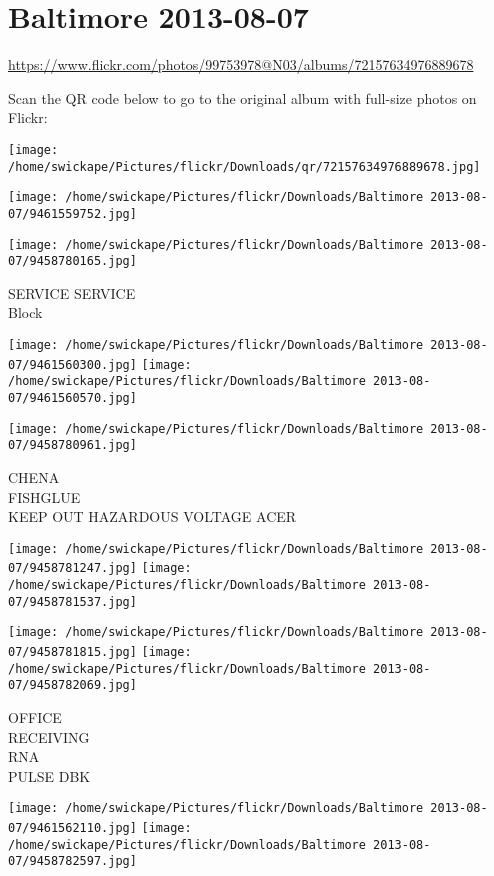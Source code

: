 \documentclass[10pt,letterpaper]{article}
\title{}
\author{}
\date{}
\begin{document}
\section*{Baltimore 2013-08-07}

\url{https://www.flickr.com/photos/99753978@N03/albums/72157634976889678}

Scan the QR code below to go to the original album with full-size photos on Flickr:

\texttt{[image: /home/swickape/Pictures/flickr/Downloads/qr/72157634976889678.jpg]}
\pagebreak

\texttt{[image: /home/swickape/Pictures/flickr/Downloads/Baltimore 2013-08-07/9461559752.jpg]}

\vspace{0.25in}
\texttt{[image: /home/swickape/Pictures/flickr/Downloads/Baltimore 2013-08-07/9458780165.jpg]}

SERVICE SERVICE\\
Block
\pagebreak

\texttt{[image: /home/swickape/Pictures/flickr/Downloads/Baltimore 2013-08-07/9461560300.jpg]}
\texttt{[image: /home/swickape/Pictures/flickr/Downloads/Baltimore 2013-08-07/9461560570.jpg]}

\vspace{0.25in}
\texttt{[image: /home/swickape/Pictures/flickr/Downloads/Baltimore 2013-08-07/9458780961.jpg]}

CHENA\\
FISHGLUE\\
KEEP OUT HAZARDOUS VOLTAGE ACER
\pagebreak

\texttt{[image: /home/swickape/Pictures/flickr/Downloads/Baltimore 2013-08-07/9458781247.jpg]}
\texttt{[image: /home/swickape/Pictures/flickr/Downloads/Baltimore 2013-08-07/9458781537.jpg]}

\texttt{[image: /home/swickape/Pictures/flickr/Downloads/Baltimore 2013-08-07/9458781815.jpg]}
\texttt{[image: /home/swickape/Pictures/flickr/Downloads/Baltimore 2013-08-07/9458782069.jpg]}

OFFICE\\
RECEIVING\\
RNA\\
PULSE DBK
\pagebreak

\texttt{[image: /home/swickape/Pictures/flickr/Downloads/Baltimore 2013-08-07/9461562110.jpg]}
\texttt{[image: /home/swickape/Pictures/flickr/Downloads/Baltimore 2013-08-07/9458782597.jpg]}
\end{document}
